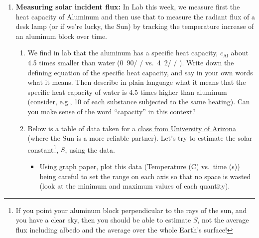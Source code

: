 \documentclass[12pt]{article}
\begin{document}
\begin{enumerate}
\begin{enumerate}
\begin{itemize}
		\end{itemize}
	\item Let's get some equations from your flux diagram.  Use the basic principle of $F_\text{in} = F_\text{out}$ for a box, to get two equations that relate  $F_\text{sun}$, $F_\text{earth}$, and $F_\text{atm}$ (two boxes means two equations).  Get a third equation by combining the two equations to eliminate one variable.
	\item Use your equations, and the Stefan-Boltzmann equation, to get a new temperature estimate for the Earth's surface.  Is this one correct?
	\end{enumerate}

\item {\bf Measuring solar incident flux:}  In Lab this week, we measure first the heat capacity of Aluminum and then use that to measure the radiant flux of a desk lamp (or if we're lucky, the Sun) by tracking the temperature increase of an aluminum block over time.
	\begin{enumerate}
	\item We find in lab that the aluminum has a specific heat capacity, $c_\text{Al}$ about 4.5 times smaller than water (\unit{0.90}{\joule / \gram / \kelvin} vs.\ \unit{4.2}{\joule / \gram / \kelvin}). Write down the defining equation of the specific heat capacity, and say in your own words what it means.  Then describe in plain language what it means that the specific heat capacity of water is 4.5 times higher than aluminum (consider, e.g., \unit{10}{\gram} of each substance subjected to the same heating).  Can you make sense of the word ``capacity'' in this context?
	\item Below is a table of data taken for a \href{http://www.atmo.arizona.edu/students/courselinks/spring13/atmo170a1s1/online_course/week_5/solar_irrad_expt.html}{class from University of Arizona} (where the Sun is a more reliable partner).  Let's try to estimate the solar constant\footnote{If you point your aluminum block perpendicular to the rays of the sun, and you have a clear sky, then you should be able to estimate $S$, not the average flux including albedo and the average over the whole Earth's surface!}, $S$, using the data.\\[6pt]
		\begin{minipage}[t]{0.4\textwidth}
		\vspace{0pt}
		\begin{itemize}[leftmargin=1.8em,labelsep=0.6em]
		\item Using graph paper, plot this data (Temperature (C) vs.\ time (s)) being careful to set the range on each axis so that no space is wasted (look at the minimum and maximum values of each quantity). 

\end{itemize}
\end{minipage}
\end{enumerate}
\end{enumerate}
\end{document}
